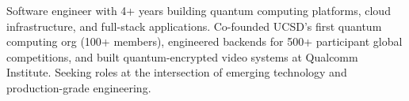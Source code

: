 

\begin{cvparagraph}

Software engineer with 4+ years building quantum computing platforms, cloud infrastructure, and full-stack applications. Co-founded UCSD's first quantum computing org (100+ members), engineered backends for 500+ participant global competitions, and built quantum-encrypted video systems at Qualcomm Institute. Seeking roles at the intersection of emerging technology and production-grade engineering.
\end{cvparagraph}
